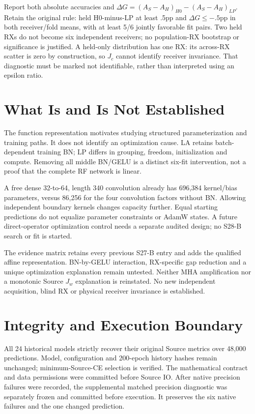 \documentclass[10pt]{article}
\begin{document}
Report both absolute accuracies and $\Delta G=(A_{S}-A_{H})_{H0}-(A_{S}-A_{H})_{LP}$. Retain the original rule: held H0-minus-LP at least .5pp and $\Delta G\leq-.5$pp in both receiver/fold means, with at least 5/6 jointly favorable fit pairs. Two held RXs do not become six independent receivers; no population-RX bootstrap or significance is justified. A held-only distribution has one RX: its across-RX scatter is zero by construction, so $J_c$ cannot identify receiver invariance. That diagnostic must be marked not identifiable, rather than interpreted using an epsilon ratio.
\clearpage
\section{What Is and Is Not Established}
The function representation motivates studying structured parameterization and training paths. It does not identify an optimization cause. LA retains batch-dependent training BN; LP differs in grouping, freedom, initialization and compute. Removing all middle BN/GELU is a distinct six-fit intervention, not a proof that the complete RF network is linear.

A free dense 32-to-64, length 340 convolution already has 696,384 kernel/bias parameters, versus 86,256 for the four convolution factors without BN. Allowing independent boundary kernels changes capacity further. Equal starting predictions do not equalize parameter constraints or AdamW states. A future direct-operator optimization control needs a separate audited design; no S28-B search or fit is started.

The evidence matrix retains every previous S27-B entry and adds the qualified affine representation. BN-by-GELU interaction, RX-specific gap reduction and a unique optimization explanation remain untested. Neither MHA amplification nor a monotonic Source $J_w$ explanation is reinstated. No new independent acquisition, blind RX or physical receiver invariance is established.
\section{Integrity and Execution Boundary}
All 24 historical models strictly recover their original Source metrics over 48,000 predictions. Model, configuration and 200-epoch history hashes remain unchanged; minimum-Source-CE selection is verified. The mathematical contract and data permissions were committed before Source IO. After native precision failures were recorded, the supplemental matched precision diagnostic was separately frozen and committed before execution. It preserves the six native failures and the one changed prediction.
\end{document}
